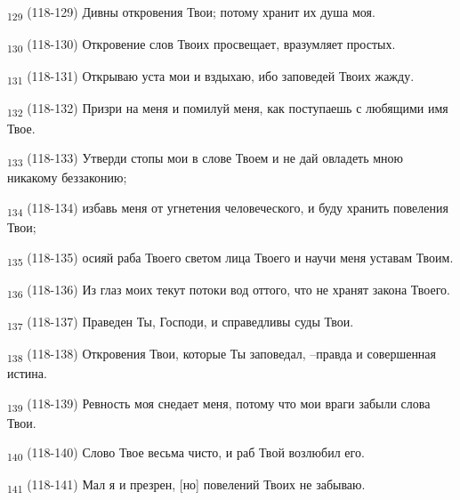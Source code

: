 \begin{tcolorbox}
\textsubscript{129} (118-129) Дивны откровения Твои; потому хранит их душа моя.
\end{tcolorbox}
\begin{tcolorbox}
\textsubscript{130} (118-130) Откровение слов Твоих просвещает, вразумляет простых.
\end{tcolorbox}
\begin{tcolorbox}
\textsubscript{131} (118-131) Открываю уста мои и вздыхаю, ибо заповедей Твоих жажду.
\end{tcolorbox}
\begin{tcolorbox}
\textsubscript{132} (118-132) Призри на меня и помилуй меня, как поступаешь с любящими имя Твое.
\end{tcolorbox}
\begin{tcolorbox}
\textsubscript{133} (118-133) Утверди стопы мои в слове Твоем и не дай овладеть мною никакому беззаконию;
\end{tcolorbox}
\begin{tcolorbox}
\textsubscript{134} (118-134) избавь меня от угнетения человеческого, и буду хранить повеления Твои;
\end{tcolorbox}
\begin{tcolorbox}
\textsubscript{135} (118-135) осияй раба Твоего светом лица Твоего и научи меня уставам Твоим.
\end{tcolorbox}
\begin{tcolorbox}
\textsubscript{136} (118-136) Из глаз моих текут потоки вод оттого, что не хранят закона Твоего.
\end{tcolorbox}
\begin{tcolorbox}
\textsubscript{137} (118-137) Праведен Ты, Господи, и справедливы суды Твои.
\end{tcolorbox}
\begin{tcolorbox}
\textsubscript{138} (118-138) Откровения Твои, которые Ты заповедал, --правда и совершенная истина.
\end{tcolorbox}
\begin{tcolorbox}
\textsubscript{139} (118-139) Ревность моя снедает меня, потому что мои враги забыли слова Твои.
\end{tcolorbox}
\begin{tcolorbox}
\textsubscript{140} (118-140) Слово Твое весьма чисто, и раб Твой возлюбил его.
\end{tcolorbox}
\begin{tcolorbox}
\textsubscript{141} (118-141) Мал я и презрен, [но] повелений Твоих не забываю.
\end{tcolorbox}
